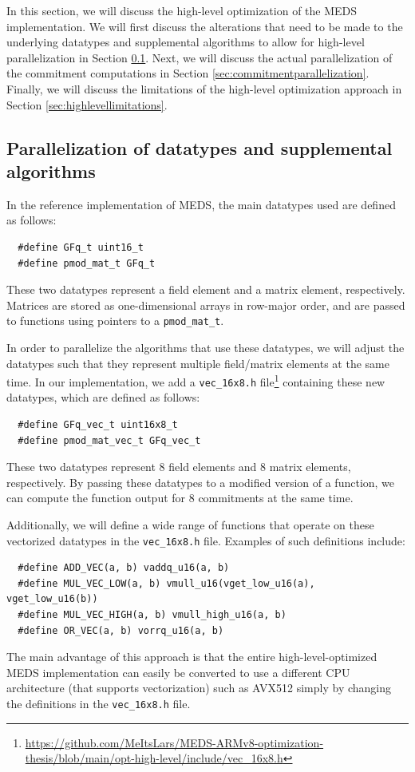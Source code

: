 \documentclass[11pt,a4paper]{report}
\theoremstyle{definition}
\begin{document}
In this section, we will discuss the high-level optimization of the MEDS implementation. We will first discuss the alterations that need to be made to the underlying datatypes and supplemental algorithms to allow for high-level parallelization in Section \ref{sec:highleveldataalgorithms}. Next, we will discuss the actual parallelization of the commitment computations in Section \ref{sec:commitmentparallelization}. Finally, we will discuss the limitations of the high-level optimization approach in Section \ref{sec:highlevellimitations}.

\subsection{Parallelization of datatypes and supplemental algorithms}
\label{sec:highleveldataalgorithms}
In the reference implementation of MEDS, the main datatypes used are defined as follows:
\begin{verbatim}
  #define GFq_t uint16_t
  #define pmod_mat_t GFq_t
\end{verbatim}
These two datatypes represent a field element and a matrix element, respectively. Matrices are stored as one-dimensional arrays in row-major order, and are passed to functions using pointers to a \texttt{pmod\_mat\_t}.

In order to parallelize the algorithms that use these datatypes, we will adjust the datatypes such that they represent multiple field/matrix elements at the same time. In our implementation, we add a \texttt{vec\_16x8.h} file\footnote{\url{https://github.com/MeItsLars/MEDS-ARMv8-optimization-thesis/blob/main/opt-high-level/include/vec\_16x8.h}} containing these new datatypes, which are defined as follows:
\begin{verbatim}
  #define GFq_vec_t uint16x8_t
  #define pmod_mat_vec_t GFq_vec_t
\end{verbatim}
These two datatypes represent 8 field elements and 8 matrix elements, respectively. By passing these datatypes to a modified version of a function, we can compute the function output for 8 commitments at the same time.

Additionally, we will define a wide range of functions that operate on these vectorized datatypes in the \texttt{vec\_16x8.h} file. Examples of such definitions include:
\begin{verbatim}
  #define ADD_VEC(a, b) vaddq_u16(a, b)
  #define MUL_VEC_LOW(a, b) vmull_u16(vget_low_u16(a), vget_low_u16(b))
  #define MUL_VEC_HIGH(a, b) vmull_high_u16(a, b)
  #define OR_VEC(a, b) vorrq_u16(a, b)
\end{verbatim}
The main advantage of this approach is that the entire high-level-optimized MEDS implementation can easily be converted to use a different CPU architecture (that supports vectorization) such as AVX512 \cite{intel-avx512} simply by changing the definitions in the \texttt{vec\_16x8.h} file.
\end{document}
